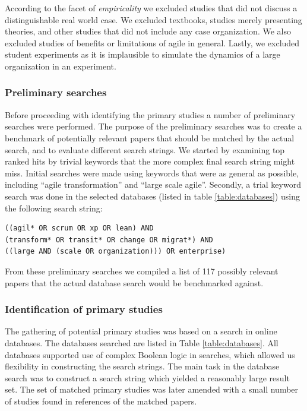 
According to the facet of \emph{empiricality} we excluded studies that did not
discuss a distinguishable real world case. We excluded textbooks, studies merely
presenting theories, and other studies that did not include any case
organization. We also excluded studies of benefits or limitations of agile in
general. Lastly, we excluded student experiments as it is implausible to
simulate the dynamics of a large organization in an experiment.


\subsubsection{Preliminary searches}

Before proceeding with identifying the primary studies a number of preliminary
searches were performed. The purpose of the preliminary searches was to create a
benchmark of potentially relevant papers that should be matched by the actual
search, and to evaluate different search strings. We started by examining top
ranked hits by trivial keywords that the more complex final search string might
miss. Initial searches were made using keywords that were as general as
possible, including ``agile transformation'' and ``large scale agile''.
Secondly, a trial keyword search was done in the selected databases (listed in
table \ref{table:databases}) using the following search string:

\begin{verbatim}
((agil* OR scrum OR xp OR lean) AND
(transform* OR transit* OR change OR migrat*) AND
((large AND (scale OR organization))) OR enterprise)
\end{verbatim}

From these preliminary searches we compiled a list of 117 possibly relevant
papers that the actual database search would be benchmarked against.


\subsubsection{Identification of primary studies}

The gathering of potential primary studies was based on a search in online
databases. The databases searched are listed in Table \ref{table:databases}. All
databases supported use of complex Boolean logic in searches, which allowed us
flexibility in constructing the search strings. The main task in the database
search was to construct a search string which yielded a reasonably large result
set. The set of matched primary studies was later amended with a small number
of studies found in references of the matched papers.

